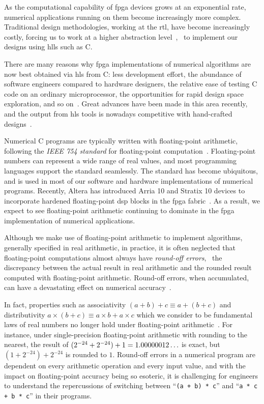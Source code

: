 As the computational capability of \gls{fpga} devices grows at an exponential
rate, numerical applications running on them become increasingly more
complex.  Traditional design methodologies, working at the \gls{rtl}, have
become increasingly costly, forcing us to work at a higher abstraction
level~\cite{gajski, bdti_xilinx, meeus12}, \eg~to implement our designs using
\glspl{hll} such as C\@.

There are many reasons why \gls{fpga} implementations of numerical algorithms
are now best obtained via \gls{hls} from C\@: less development effort, the
abundance of software engineers compared to hardware designers, the relative
ease of testing C code on an ordinary microprocessor, the opportunities
for rapid design space exploration, and so on~\cite{gajski94, meeus12,
nane15}. Great advances have been made in this area recently, and the
output from \gls{hls} tools is nowadays competitive with hand-crafted
designs~\cite{bdti_xilinx}.

Numerical C programs are typically written with floating-point
arithmetic, following the \emph{IEEE 754 standard} for floating-point
computation~\cite{ieee754}.  Floating-point numbers can represent a wide
range of real values, and most programming languages support the standard
seamlessly.  The standard has become ubiquitous, and is used in most of our
software and hardware implementations of numerical programs.  Recently,
Altera has introduced Arria 10 and Stratix 10 devices to incorporate hardened
floating-point \gls{dsp} blocks in the \gls{fpga} fabric~\cite{stratix10fp}.
As a result, we expect to see floating-point arithmetic continuing to dominate
in the \gls{fpga} implementation of numerical applications.

Although we make use of floating-point arithmetic to implement algorithms,
generally specified in real arithmetic, in practice, it is often neglected that
floating-point computations almost always have \emph{round-off errors}, \ie~the
discrepancy between the actual result in real arithmetic and the rounded result
computed with floating-point arithmetic.  Round-off errors, when accumulated,
can have a devastating effect on numerical accuracy~\cite{higham02}.

In fact, properties such as associativity $(a + b) + c \equiv a + (b +
c)$ and distributivity $a \times (b + c) \equiv a \times b + a \times c$
which we consider to be fundamental laws of real numbers no longer hold
under floating-point arithmetic~\cite{goldberg}.  For instance, under
single-precision floating-point arithmetic with rounding to the nearest, the
result of $(2^{-24} + 2^{-24}) + 1 = 1.00000012\mathellipsis$ is exact, but
$(1 + 2^{-24}) + 2^{-24}$ is rounded to $1$.  Round-off errors in a numerical
program are dependent on every arithmetic operation and every input value, and
with the impact on floating-point accuracy being so esoteric, it is challenging
for engineers to understand the repercussions of switching between
``\verb|(a + b) * c|'' and ``\verb|a * c + b * c|'' in their programs.


